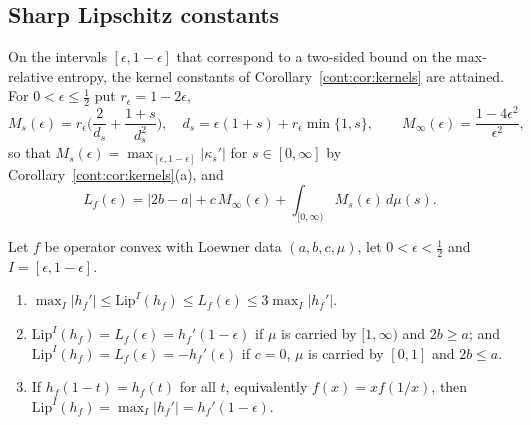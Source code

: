 \subsection{Sharp Lipschitz constants}
 
On the intervals $[\epsilon,1-\epsilon]$ that correspond to a two-sided bound on the max-relative entropy, the kernel constants of Corollary~\ref{cont:cor:kernels} are attained. For $0<\epsilon\leq\frac12$ put $r_\epsilon=1-2\epsilon$,
\[
M_s(\epsilon)=r_\epsilon\Big(\frac{2}{d_s}+\frac{1+s}{d_s^2}\Big),\quad d_s=\epsilon(1+s)+r_\epsilon\min\{1,s\},\qquad M_\infty(\epsilon)=\frac{1-4\epsilon^2}{\epsilon^2},
\]
so that $M_s(\epsilon)=\max_{[\epsilon,1-\epsilon]}|\kappa_s'|$ for $s\in[0,\infty]$ by Corollary~\ref{cont:cor:kernels}(a), and
\[
L_f(\epsilon)=|2b-a|+c\,M_\infty(\epsilon)+\int_{[0,\infty)}M_s(\epsilon)\,d\mu(s).
\]
 
\begin{theorem}\label{cont:thm:sharp lipschitz}
Let $f$ be operator convex with Loewner data $(a,b,c,\mu)$, let $0<\epsilon<\frac12$ and $I=[\epsilon,1-\epsilon]$.
\begin{enumerate}
\item[(a)] $\max_I|h_f'|\leq\mathrm{Lip}^I(h_f)\leq L_f(\epsilon)\leq3\max_I|h_f'|$.
\item[(b)] $\mathrm{Lip}^I(h_f)=L_f(\epsilon)=h_f'(1-\epsilon)$ if $\mu$ is carried by $[1,\infty)$ and $2b\geq a$; and $\mathrm{Lip}^I(h_f)=L_f(\epsilon)=-h_f'(\epsilon)$ if $c=0$, $\mu$ is carried by $[0,1]$ and $2b\leq a$.
\item[(c)] If $h_f(1-t)=h_f(t)$ for all $t$, equivalently $f(x)=xf(1/x)$, then $\mathrm{Lip}^I(h_f)=\max_I|h_f'|=h_f'(1-\epsilon)$.
\end{enumerate}
\end{theorem}
 
